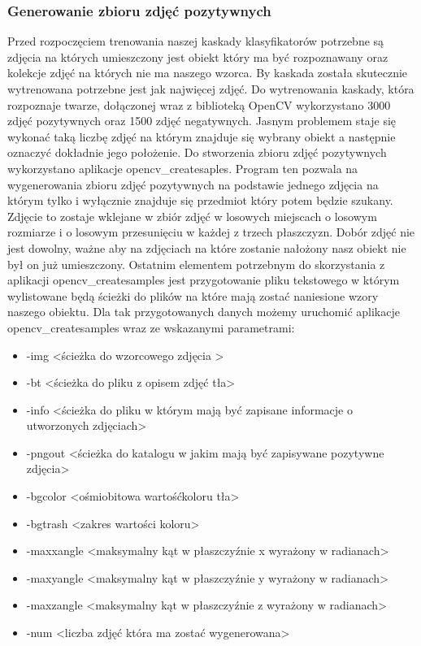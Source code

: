 \subsubsection{Generowanie zbioru zdjęć pozytywnych}\label{sec:generowanieZdjec}
Przed rozpoczęciem trenowania naszej kaskady klasyfikatorów potrzebne są zdjęcia na których umieszczony jest  obiekt który ma być rozpoznawany oraz kolekcje zdjęć na których nie ma naszego wzorca. By kaskada została skutecznie wytrenowana potrzebne jest jak najwięcej zdjęć. Do wytrenowania kaskady, która rozpoznaje twarze, dołączonej wraz z biblioteką OpenCV wykorzystano 3000 zdjęć pozytywnych oraz 1500 zdjęć negatywnych. Jasnym problemem staje się wykonać taką liczbę zdjęć na którym znajduje się wybrany obiekt a następnie oznaczyć dokładnie jego położenie. Do stworzenia zbioru zdjęć pozytywnych wykorzystano aplikacje opencv\_createsaples. Program ten pozwala na wygenerowania zbioru zdjęć pozytywnych na podstawie jednego zdjęcia na którym tylko i wyłącznie znajduje się przedmiot który potem będzie szukany. Zdjęcie to zostaje wklejane w zbiór zdjęć w losowych miejscach o losowym rozmiarze i o losowym przesunięciu w każdej z trzech płaszczyzn. Dobór zdjęć nie jest dowolny, ważne aby na zdjęciach na które zostanie nałożony nasz obiekt nie był on już umieszczony. Ostatnim elementem potrzebnym do skorzystania z aplikacji opencv\_createsamples jest przygotowanie pliku tekstowego w którym wylistowane będą ścieżki do plików na które mają zostać naniesione wzory naszego obiektu. Dla tak przygotowanych danych możemy uruchomić aplikacje opencv\_createsamples wraz ze wskazanymi parametrami:
\begin{itemize}
    \item -img \textless ścieżka do wzorcowego zdjęcia \textgreater
    \item -bt \textless ścieżka do pliku z opisem zdjęć tła\textgreater
    \item -info \textless ścieżka do pliku w którym mają być zapisane informacje o utworzonych zdjęciach\textgreater
    \item -pngout \textless ścieżka do katalogu w jakim mają być zapisywane pozytywne zdjęcia\textgreater
    \item -bgcolor \textless ośmiobitowa wartośćkoloru tła\textgreater
    \item -bgtrash \textless zakres wartości koloru\textgreater
    \item -maxxangle \textless maksymalny kąt w płaszczyźnie x wyrażony w radianach\textgreater
    \item -maxyangle \textless maksymalny kąt w płaszczyźnie y wyrażony w radianach\textgreater
    \item -maxzangle \textless maksymalny kąt w płaszczyźnie z wyrażony w radianach\textgreater
    \item -num \textless liczba zdjęć która ma zostać wygenerowana>

\end{itemize}


